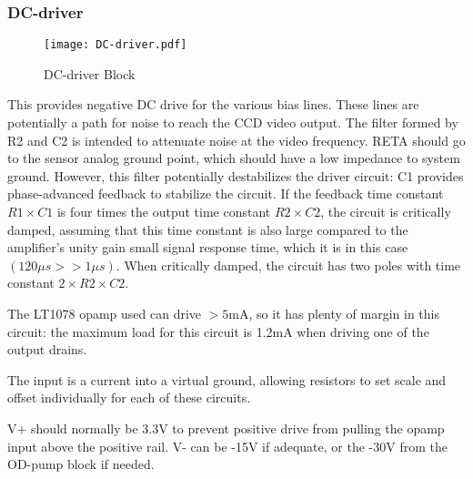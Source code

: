 \documentclass[a4paper,12pt]{article}
\begin{document}
%



\subsubsection{DC-driver}
   \begin{figure}
   \begin{center}
   \texttt{[image: DC-driver.pdf]}
   \end{center}
   \caption{DC-driver Block}
   \end{figure}

This provides negative DC drive for the various bias lines. These lines are potentially a path for noise to reach the CCD video output. The filter formed by R2 and C2 is intended to attenuate noise at the video frequency. RETA should go to the sensor analog ground point, which should have a low impedance to system ground.
However, this filter potentially destabilizes the driver circuit: C1 provides phase-advanced feedback to stabilize the circuit. If the feedback time constant $R1\times C1$ is four times the output time constant $R2\times C2$, the circuit is critically damped, assuming that this time constant is also large compared to the amplifier's unity gain small signal response time, which it is in this case $(120\mu s>>1 \mu s)$. When critically damped, the circuit has two poles with time constant $2\times R2\times C2$.

The LT1078 opamp used can drive $>5$mA, so it has plenty of margin in this circuit: the maximum load for this circuit is 1.2mA when driving one of the output drains. 

The input is a current into a virtual ground, allowing resistors to set scale and offset individually for each of these circuits.

V+ should normally be 3.3V to prevent positive drive from pulling the opamp input above the positive rail. V- can be -15V if adequate, or the -30V from the OD-pump block if needed.
\end{document}
